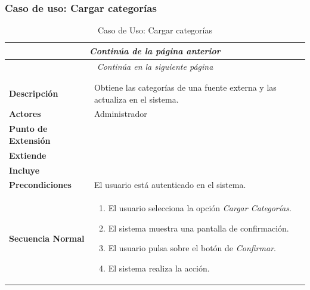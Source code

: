 \newpage
\subsubsection*{Caso de uso: Cargar categorías }
\begin{longtable}{| p{4cm} | p{10cm} |}
\endfirsthead
\multicolumn{2}{c}{\textit{Continúa de la página anterior}}\\[12pt]
\hline
\endhead
\hline
\multicolumn{2}{c}{\textit{Continúa en la siguiente página}} \\
\endfoot
\hline
\caption{Caso de Uso: Cargar categorías}\label{fig:1}\\
\endlastfoot


\hline
\multicolumn{2}{|c|}{\textbf{CU$<$43$>$ - Cargar Categorías}} \\

\hline
\textbf{Descripción} &
Obtiene las categorías de una fuente externa y las actualiza en el sistema.\\

\hline
\textbf{Actores} &
Administrador\\

\hline
\textbf{Punto de Extensión} &
\\

\hline
\textbf{Extiende} &
\\

\hline
\textbf{Incluye} &
\\

\hline
\textbf{Precondiciones} &
El usuario está autenticado en el sistema.\\

\hline
\textbf{Secuencia Normal} &\mbox{}\par\vspace{-\baselineskip}
\begin{enumerate}[leftmargin=0.7cm, topsep=0.1cm]
\item El usuario selecciona la opción \textit{Cargar Categorías}.
\item El sistema muestra una pantalla de confirmación.
\item El usuario pulsa sobre el botón de \textit{Confirmar}.
\item El sistema realiza la acción.
\end{enumerate}



\end{longtable}
